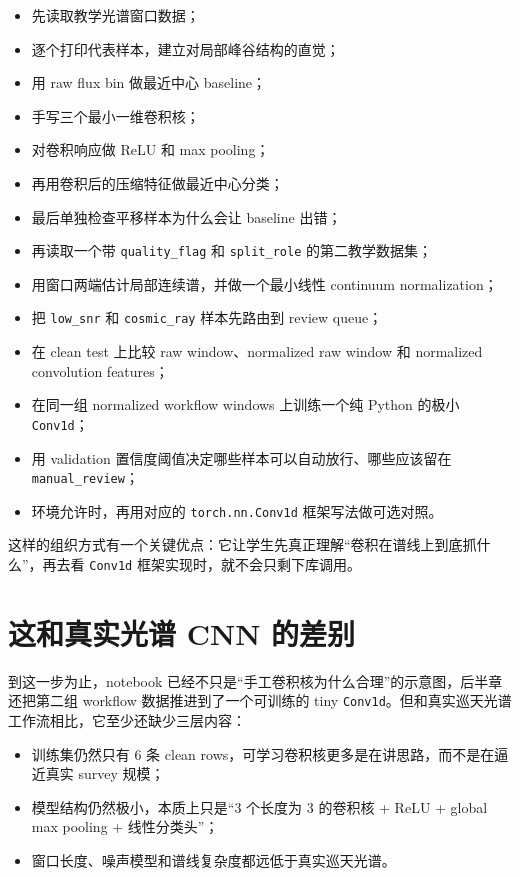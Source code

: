 \begin{itemize}
    \item 先读取教学光谱窗口数据；
    \item 逐个打印代表样本，建立对局部峰谷结构的直觉；
    \item 用 raw flux bin 做最近中心 baseline；
    \item 手写三个最小一维卷积核；
    \item 对卷积响应做 ReLU 和 max pooling；
    \item 再用卷积后的压缩特征做最近中心分类；
    \item 最后单独检查平移样本为什么会让 baseline 出错；
    \item 再读取一个带 \texttt{quality\_flag} 和 \texttt{split\_role} 的第二教学数据集；
    \item 用窗口两端估计局部连续谱，并做一个最小线性 continuum normalization；
    \item 把 \texttt{low\_snr} 和 \texttt{cosmic\_ray} 样本先路由到 review queue；
    \item 在 clean test 上比较 raw window、normalized raw window 和 normalized convolution features；
    \item 在同一组 normalized workflow windows 上训练一个纯 Python 的极小 \texttt{Conv1d}；
    \item 用 validation 置信度阈值决定哪些样本可以自动放行、哪些应该留在 \texttt{manual\_review}；
    \item 环境允许时，再用对应的 \texttt{torch.nn.Conv1d} 框架写法做可选对照。
\end{itemize}

这样的组织方式有一个关键优点：它让学生先真正理解“卷积在谱线上到底抓什么”，再去看 \texttt{Conv1d} 框架实现时，就不会只剩下库调用。

\section{这和真实光谱 CNN 的差别}

到这一步为止，notebook 已经不只是“手工卷积核为什么合理”的示意图，后半章还把第二组 workflow 数据推进到了一个可训练的 tiny \texttt{Conv1d}。但和真实巡天光谱工作流相比，它至少还缺少三层内容：

\begin{itemize}
    \item 训练集仍然只有 6 条 clean rows，可学习卷积核更多是在讲思路，而不是在逼近真实 survey 规模；
    \item 模型结构仍然极小，本质上只是“3 个长度为 3 的卷积核 + ReLU + global max pooling + 线性分类头”；
    \item 窗口长度、噪声模型和谱线复杂度都远低于真实巡天光谱。
\end{itemize}

